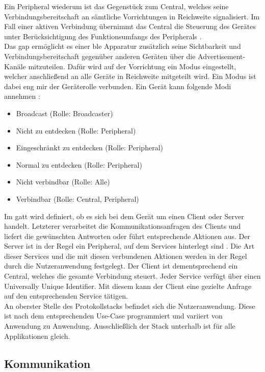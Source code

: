 \noindent Ein Peripheral wiederum ist das Gegenstück zum Central, welches seine Verbindungsbereitschaft an sämtliche Vorrichtungen in Reichweite signalisiert. Im Fall einer aktiven Verbindung übernimmt das Central die Steuerung des Gerätes unter Berücksichtigung des Funktionsumfangs des Peripherals \cite[Seite 34]{Usama17:BBS}.\\
\noindent Das \ac{gap} ermöglicht es einer \ac{ble} Apparatur zusätzlich seine Sichtbarkeit und Verbindungsbereitschaft gegenüber anderen Geräten über die Advertisement-Kanäle mitzuteilen. Dafür wird auf der Vorrichtung ein Modus eingestellt, welcher anschließend an alle Geräte in Reichweite mitgeteilt wird. Ein Modus ist dabei eng mir der Geräterolle verbunden. Ein Gerät kann folgende Modi annehmen \cite[Seite 35]{Townsend14:GSB}:
\begin{itemize}
	\setlength{\itemsep}{1pt}
	\item{Broadcast (Rolle: Broadcaster)}
	\item{Nicht zu entdecken (Rolle: Peripheral)}
	\item{Eingeschränkt zu entdecken (Rolle: Peripheral)}
	\item{Normal zu entdecken (Rolle: Peripheral)}
	\item{Nicht verbindbar (Rolle: Alle)}
	\item{Verbindbar (Rolle: Central, Peripheral)}
\end{itemize}   
\noindent Im \ac{gatt} wird definiert, ob es sich bei dem Gerät um einen Client oder Server handelt. Letzterer verarbeitet die Kommunikationsanfragen des Clients und liefert die gewünschten Antworten oder führt entsprechende Aktionen aus. Der Server ist in der Regel ein Peripheral, auf dem Services hinterlegt sind \cite[Seite 30]{Usama17:BBS}. Die Art dieser Services und die mit diesen verbundenen Aktionen werden in der Regel durch die Nutzeranwendung festgelegt. Der Client ist dementsprechend ein Central, welches die gesamte Verbindung steuert. Jeder Service verfügt über einen Universally Unique Identifier. Mit diesem kann der Client eine gezielte Anfrage auf den entsprechenden Service tätigen.\\    
\noindent An oberster Stelle des Protokollstacks befindet sich die Nutzeranwendung. Diese ist nach dem entsprechenden Use-Case programmiert und variiert von Anwendung zu Anwendung. Ausschließlich der Stack unterhalb ist für alle Applikationen gleich.\\

\subsection{Kommunikation}
\label{ss:funktionsweise:kommunkation}


